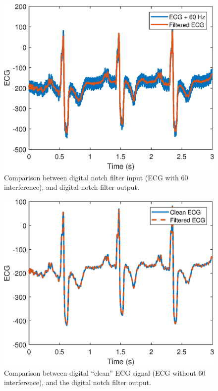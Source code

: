 \documentclass{article}
\begin{document}
\FloatBarrier
\begin{figure}[h!]
	\centering
	\includegraphics[scale=0.9]{figs/ecg_comparison1.eps}
	\caption{Comparison between digital notch filter input (ECG with 60 interference), and digital notch filter output.} \label{fig:egc:comparison1}
\end{figure}
\FloatBarrier

\FloatBarrier
\begin{figure}[h!]
	\centering
	\includegraphics[scale=0.9]{figs/ecg_comparison2.eps}
	\caption{Comparison between digital ``clean'' ECG signal (ECG without 60 interference), and the digital notch filter output.} \label{fig:egc:comparison2}
\end{figure}
\FloatBarrier
\end{document}
